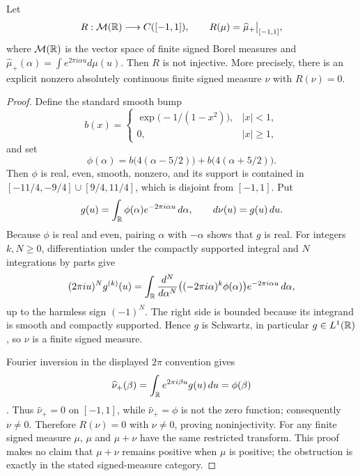 \begin{theorem}
\label{thm:restricted-transform-obstruction-complete}
Let
\[
 R:\mathcal M(\mathbb R)\longrightarrow C([-1,1]),
 \qquad R(\mu)=\widehat\mu_+\big|_{[-1,1]},
\]
where $\mathcal M(\mathbb R)$ is the vector space of finite signed Borel measures and
$\widehat\mu_+(\alpha)=\int e^{2\pi i\alpha u}d\mu(u)$.  Then $R$ is not
injective.  More precisely, there is an explicit nonzero absolutely continuous
finite signed measure $\nu$ with $R(\nu)=0$.
\end{theorem}

\begin{proof}
Define the standard smooth bump
\[
 b(x)=
 \begin{cases}
  \exp\!\bigl(-1/(1-x^2)\bigr),&|x|<1,\\
  0,&|x|\geq1,
 \end{cases}
\]
and set
\[
 \phi(\alpha)=b\bigl(4(\alpha-5/2)\bigr)
                +b\bigl(4(\alpha+5/2)\bigr).
\]
Then $\phi$ is real, even, smooth, nonzero, and its support is contained in
$[-11/4,-9/4]\cup[9/4,11/4]$, which is disjoint from $[-1,1]$.  Put
\begin{equation}
 g(u)=\int_\mathbb R\phi(\alpha)e^{-2\pi i\alpha u}\,d\alpha,
 \qquad d\nu(u)=g(u)\,du.
 \label{eq:restriction-witness}
\end{equation}
Because $\phi$ is real and even, pairing $\alpha$ with $-\alpha$ shows that
$g$ is real.  For integers $k,N\geq0$, differentiation under the compactly
supported integral and $N$ integrations by parts give
\[
 (2\pi i u)^N g^{(k)}(u)
 =\int_\mathbb R
 \frac{d^N}{d\alpha^N}
 \bigl((-2\pi i\alpha)^k\phi(\alpha)\bigr)
 e^{-2\pi i\alpha u}\,d\alpha,
\]
up to the harmless sign $(-1)^N$.  The right side is bounded because its
integrand is smooth and compactly supported.  Hence $g$ is Schwartz, in
particular $g\in L^1(\mathbb R)$, so $\nu$ is a finite signed measure.

Fourier inversion in the displayed $2\pi$ convention gives
\begin{equation}
 \widehat\nu_+(\beta)
 =\int_\mathbb R e^{2\pi i\beta u}g(u)\,du
 =\phi(\beta)
 \label{eq:restriction-witness-transform}
\end{equation}
\cite[pp.~21--23, Thm.~1.5.1]{rudin1990}.  Thus
$\widehat\nu_+=0$ on $[-1,1]$, while $\widehat\nu_+=\phi$ is not the zero
function; consequently $\nu\neq0$.  Therefore $R(\nu)=0$ with
$\nu\neq0$, proving noninjectivity.  For any finite signed measure $\mu$,
$\mu$ and $\mu+\nu$ have the same restricted transform.  This proof makes no
claim that $\mu+\nu$ remains positive when $\mu$ is positive; the obstruction
is exactly in the stated signed-measure category.
\end{proof}


